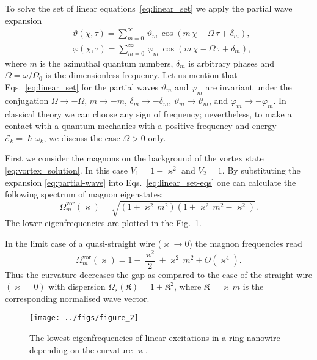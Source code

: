 \documentclass[showpacs,amsmath,amssymb,aps,pra,longbibliography,
10pt,preprint,superscriptaddress,showkeys]{revtex4-1}
\begin{document}
To solve the set of linear equations~\eqref{eq:linear_set} we apply the partial wave expansion
\begin{equation} \label{eq:partial-wave}
	\begin{split}
		&\vartheta(\chi, \tau) = \sum_{m=0}^{\infty} \, \vartheta_m \, \cos \left( m \, \chi - \Omega \, \tau + \delta_m \right), \\
		&\varphi(\chi, \tau) = \sum_{m=0}^{\infty} \, \varphi_m \, \cos \left( m \, \chi - \Omega \, \tau + \delta_m \right),
	\end{split}
\end{equation} 
where $m$ is the azimuthal quantum numbers, $\delta_m$ is arbitrary phases and $\Omega=\omega/\Omega_0$ is the dimensionless frequency. Let us mention that Eqs.~\eqref{eq:linear_set} for the partial waves $\vartheta _m$ and $\varphi _m$ are invariant under the conjugation $\Omega \to-\Omega $, $m\to-m$, $\delta _m\to-\delta _m$, $\vartheta _m\to\vartheta _m$, and $\varphi _m\to-\varphi _m$. In classical theory we can choose any sign of frequency; nevertheless, to make a contact with a quantum mechanics with a positive frequency and energy $\mathscr{E}_k=\hslash \omega _k$, we discuss the case $\Omega >0$ only.

First we consider the magnons on the background of the vortex state \eqref{eq:vortex_solution}. In this case $V_1=1-\varkappa ^2$ and $V_2=1$. By substituting the expansion \eqref{eq:partial-wave} into Eqs.~\eqref{eq:linear_set-eqs} one can calculate the following spectrum of magnon eigenstates:
\begin{equation} \label{eq:spectrum-vortex}
\Omega _m^{\mathrm{vor}}(\varkappa ) = \sqrt{\left( 1+ \varkappa^2 \, m^2\right)\left( 1+ \varkappa^2 \, m^2-\varkappa ^2\right)}.
\end{equation}
The lower eigenfrequencies are plotted in the Fig.~\ref{fig:circle_spectrum}.

In the limit case of a quasi-straight wire ($\varkappa \to0$) the magnon frequencies read
\begin{equation*}
\Omega _m^{\mathrm{vor}}(\varkappa ) = 1-\frac{\varkappa ^2}{2}+\varkappa ^2 \, m^2+ O\left( \varkappa^4 \right).
\end{equation*}
Thus the curvature decreases the gap as compared to the case of the straight wire $(\varkappa =0)$  with dispersion $\Omega _s(\mathfrak{K}) = 1+ \mathfrak{K}^2$, where $\mathfrak{K}=\varkappa \, m$ is the corresponding normalised wave vector. 

\begin{figure}
	{\centering
		\texttt{[image: ../figs/figure\_2]}
	}
	\caption{The lowest eigenfrequencies of linear excitations in a ring nanowire depending on the curvature $\varkappa$.}
	\label{fig:circle_spectrum}
\end{figure}
\end{document}
